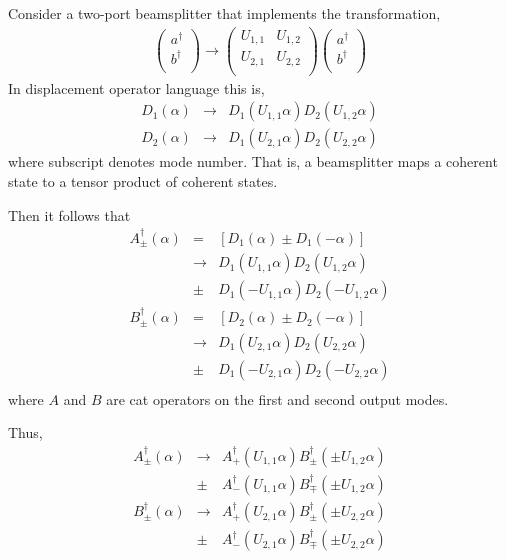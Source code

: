 \documentclass[aps,prl,twocolumn,amsmath,amssymb,nofootinbib,superscriptaddress]{revtex4}
\begin{document}
Consider a two-port beamsplitter that implements the transformation,
\begin{eqnarray}
\left( \begin{array}{c}
a^\dag \\
b^\dag \\
\end{array} \right)
\to \left( \begin{array}{cc}
U_{1,1} & U_{1,2} \\
U_{2,1} & U_{2,2} \\
\end{array} \right)
\left( \begin{array}{c}
a^\dag \\
b^\dag \\
\end{array} \right)
\end{eqnarray}
In displacement operator language this is,
\begin{eqnarray}
D_1(\alpha) &\to& D_1(U_{1,1} \alpha) D_2(U_{1,2} \alpha) \nonumber \\
D_2(\alpha) &\to& D_1(U_{2,1} \alpha) D_2(U_{2,2} \alpha)
\end{eqnarray}
where subscript denotes mode number. That is, a beamsplitter maps a coherent state to a tensor product of coherent states.

Then it follows that
\begin{eqnarray}
A_\pm^\dag(\alpha) &=& [D_1(\alpha)\pm D_1(-\alpha)] \nonumber \\
&\to& D_1(U_{1,1}\alpha)D_2(U_{1,2}\alpha)\nonumber\\
&\pm& D_1(-U_{1,1}\alpha)D_2(-U_{1,2}\alpha) \nonumber \\
B_\pm^\dag(\alpha) &=& [D_2(\alpha)\pm D_2(-\alpha)] \nonumber \\
&\to& D_1(U_{2,1}\alpha)D_2(U_{2,2}\alpha)\nonumber\\
&\pm& D_1(-U_{2,1}\alpha)D_2(-U_{2,2}\alpha) \nonumber \\
\end{eqnarray}
where $A$ and $B$ are cat operators on the first and second output modes.

Thus,
\begin{eqnarray}
A_\pm^\dag(\alpha) &\to& A_+^\dag(U_{1,1} \alpha) B_\pm^\dag(\pm U_{1,2} \alpha) \nonumber\\
&\pm& A_-^\dag(U_{1,1} \alpha)B_\mp^\dag(\pm U_{1,2} \alpha) \nonumber \\
B_\pm^\dag(\alpha) &\to& A_+^\dag(U_{2,1} \alpha) B_\pm^\dag(\pm U_{2,2} \alpha) \nonumber\\
&\pm& A_-^\dag(U_{2,1} \alpha)B_\mp^\dag(\pm U_{2,2} \alpha)
\end{eqnarray}
\end{document}
